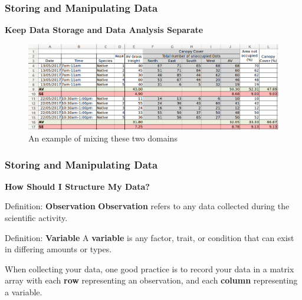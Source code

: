 \documentclass{beamer}
\begin{document}

\begin{frame}
\frametitle{Storing and Manipulating Data}
\textbf{Keep Data Storage and Data Analysis Separate}
\vspace{0.5cm}
\begin{figure}
\includegraphics[scale=0.33]{bad_structure}
\caption{An example of mixing these two domains}
\end{figure}
\end{frame}


\begin{frame}
\frametitle{Storing and Manipulating Data}
\textbf{How Should I Structure My Data?}
\vspace{0.5cm}
\begin{block}{Definition: \textbf{Observation}}
\textbf{Observation} refers to any data collected during the scientific activity.
\end{block}
\vspace{0.5cm}
\begin{block}{Definition: \textbf{Variable}}
A \textbf{variable} is any factor, trait, or condition that can exist in differing amounts or types.
\end{block}
\vspace{0.5cm}
When collecting your data, one good practice is to record your data in a matrix array with each \textbf{row} representing an observation, and each \textbf{column} representing a variable.
\end{frame}

\end{document}
